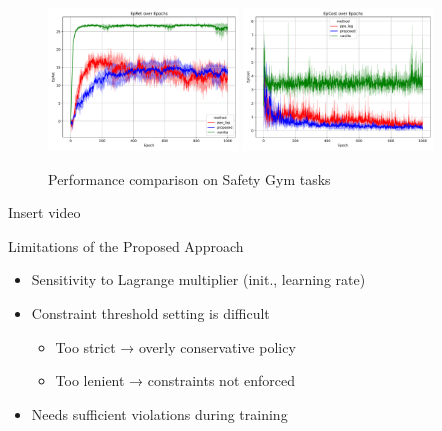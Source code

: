 \documentclass[8pt, aspectratio=169]{beamer} %
\begin{document}
\begin{frame}{\insertsubsectionhead}

  {
    \begin{figure}
      \includegraphics[width=0.45\textwidth]{figures/result_reward.pdf}
      \hspace{1cm}
      \includegraphics[width=0.45\textwidth]{figures/result_cost.pdf}
      \caption{Performance comparison on Safety Gym tasks}
    \end{figure}
  }

\end{frame}

\begin{frame}{\insertsubsectionhead}

  Insert video

\end{frame}

\begin{frame}{\insertsubsectionhead}

  Limitations of the Proposed Approach

  \begin{itemize}
    \item<1-> Sensitivity to Lagrange multiplier (init., learning rate)
    \item<2-> Constraint threshold setting is difficult
      \begin{itemize}
        \item<2-> Too strict → overly conservative policy
        \item<2-> Too lenient → constraints not enforced
      \end{itemize}
    \item<3-> Needs sufficient violations during training
  \end{itemize}

\end{frame}
\end{document}
